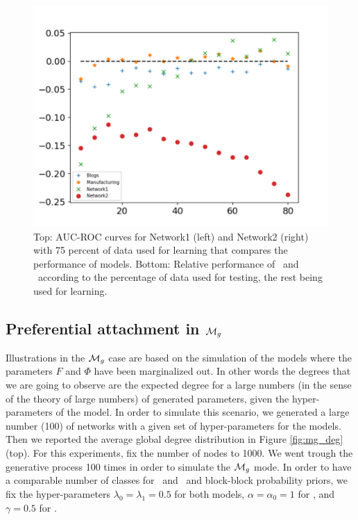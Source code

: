 \begin{figure}[ht]
\begin{minipage}{0.5\textwidth}
        \includegraphics[width=\textwidth]{img/corpus/testset_max_20}
    \end{minipage}
    \caption{Top: AUC-ROC curves for Network1 (left) and Network2 (right) with 75 percent of data used for learning that compares the performance of models. Bottom: Relative performance of \imb\ and \ifm\ according to the percentage of data used for testing, the rest being used for learning.} 
\label{fig:auc}
\end{figure}


\subsection{Preferential attachment in $\mathcal{M}_g$}

Illustrations in the $\mathcal{M}_g$ case are based on the simulation of the models where the parameters $F$ and $\Phi$ have been marginalized out. In other words the degrees that we are going to observe are the expected degree for a large numbers (in the sense of the theory of large numbers) of generated parameters, given the hyper-parameters of the model. In order to simulate this scenario, we generated a large number (100) of networks with a given set of hyper-parameters for the models. Then we reported the average global degree distribution in Figure \ref{fig:mg_deg} (top).  For  this  experiments, fix the number of nodes to 1000. We went trough the generative process 100 times in order to simulate the $\mathcal{M}_g$ mode. In order to have a comparable number of classes for \ifm\ and \imb\ and block-block probability priors, we fix the hyper-parameters  $\lambda_0=\lambda_1=0.5$ for both models,  $\alpha=\alpha_0=1$ for \ifm, and  $\gamma=0.5$ for \imb.

